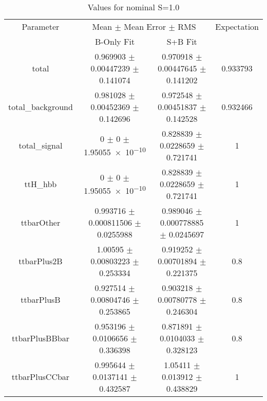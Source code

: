 \begin{table}
\centering
\caption{Values for nominal S=1.0}
\begin{tabular}{cccc}
\toprule
Parameter & \multicolumn{2}{c}{Mean $\pm$ Mean Error $\pm$ RMS} & Expectation\\
 & B-Only Fit & S+B Fit & \\
\midrule
total & \num{0.969903} $\pm$ \num{0.00447239} $\pm$ \num{0.141074} & \num{0.970918} $\pm$ \num{0.00447645} $\pm$ \num{0.141202} & \num{0.933793}\\
total\_background & \num{0.981028} $\pm$ \num{0.00452369} $\pm$ \num{0.142696} & \num{0.972548} $\pm$ \num{0.00451837} $\pm$ \num{0.142528} & \num{0.932466}\\
total\_signal & \num{0} $\pm$ \num{0} $\pm$ \num{1.95055e-10} & \num{0.828839} $\pm$ \num{0.0228659} $\pm$ \num{0.721741} & \num{1}\\
ttH\_hbb & \num{0} $\pm$ \num{0} $\pm$ \num{1.95055e-10} & \num{0.828839} $\pm$ \num{0.0228659} $\pm$ \num{0.721741} & \num{1}\\
ttbarOther & \num{0.993716} $\pm$ \num{0.000811506} $\pm$ \num{0.0255988} & \num{0.989046} $\pm$ \num{0.000778885} $\pm$ \num{0.0245697} & \num{1}\\
ttbarPlus2B & \num{1.00595} $\pm$ \num{0.00803223} $\pm$ \num{0.253334} & \num{0.919252} $\pm$ \num{0.00701894} $\pm$ \num{0.221375} & \num{0.8}\\
ttbarPlusB & \num{0.927514} $\pm$ \num{0.00804746} $\pm$ \num{0.253865} & \num{0.903218} $\pm$ \num{0.00780778} $\pm$ \num{0.246304} & \num{0.8}\\
ttbarPlusBBbar & \num{0.953196} $\pm$ \num{0.0106656} $\pm$ \num{0.336398} & \num{0.871891} $\pm$ \num{0.0104033} $\pm$ \num{0.328123} & \num{0.8}\\
ttbarPlusCCbar & \num{0.995644} $\pm$ \num{0.0137141} $\pm$ \num{0.432587} & \num{1.05411} $\pm$ \num{0.013912} $\pm$ \num{0.438829} & \num{1}\\
\bottomrule
\end{tabular}
\end{table}